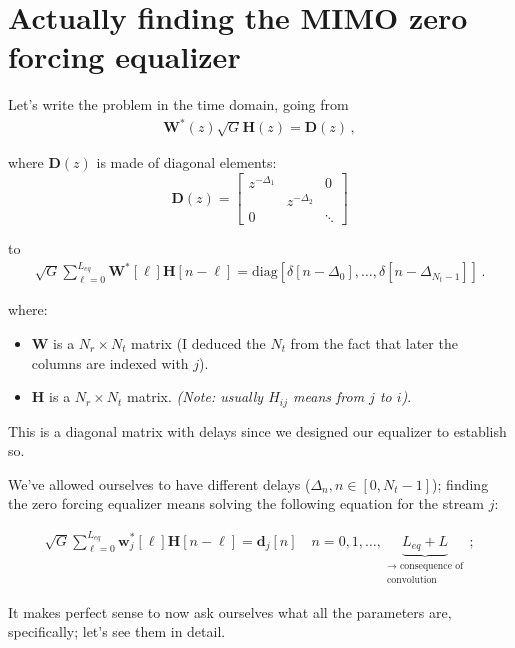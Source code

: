 \documentclass[a4paper, 12pt]{book}
\begin{document}
\section{Actually finding the MIMO zero forcing equalizer}

Let's write the problem in the time domain, going from
\begin{align}
    \mathbf{W}^*(z)\sqrt{G}\mathbf{H}(z) = \mathbf{D}(z) \,, \tag{2.130}
\end{align}

where $\mathbf{D}(z)$ is made of diagonal elements:
\[
\mathbf{D}(z) = \begin{bmatrix}
z^{-\Delta_1} & & 0 \\
& z^{-\Delta_2} & \\
0 & & \ddots
\end{bmatrix}
\]

to
\begin{align}
    \sqrt{G} \sum_{\ell=0}^{L_{eq}} \mathbf{W}^*[\ell]\mathbf{H}[n-\ell] = \text{diag}[\delta[n-\Delta_0], \dots, \delta[n-\Delta_{N_t-1}]] \,. \tag{2.132}
\end{align}

where:
\begin{itemize}
    \item $\mathbf{W}$ is a $N_r \times N_t$ matrix (I deduced the $N_t$ from the fact that later the columns are indexed with $j$).
    \item $\mathbf{H}$ is a $N_r \times N_t$ matrix. \textit{(Note: usually $H_{ij}$ means from $j$ to $i$)}.
\end{itemize}

This is a diagonal matrix with delays since we designed our equalizer to establish so.

We've allowed ourselves to have different delays ($\Delta_n, n \in [0, N_t-1]$); finding the zero forcing equalizer means solving the following equation for the stream $j$:

\begin{align}
    \sqrt{G} \sum_{\ell=0}^{L_{eq}} \mathbf{w}_j^*[\ell]\mathbf{H}[n-\ell] = \mathbf{d}_j[n] \quad n=0, 1, \dots, \underbrace{L_{eq} + L}_{\substack{\rightarrow \text{ consequence of} \\ \text{convolution}}} \,; \tag{2.133}
\end{align}

It makes perfect sense to now ask ourselves what all the parameters are, specifically; let's see them in detail.
\end{document}
